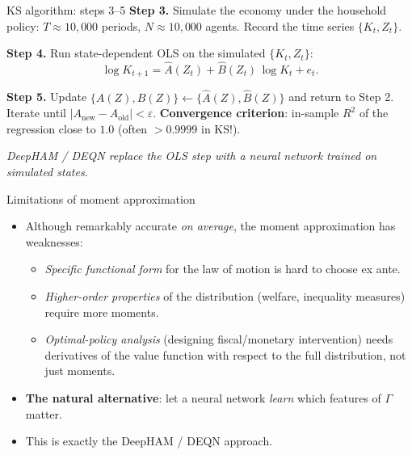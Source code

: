 \begin{frame}{KS algorithm: steps 3--5}
\textbf{Step 3.} Simulate the economy under the household policy: $T \approx 10{,}000$ periods, $N \approx 10{,}000$ agents. Record the time series $\{K_t, Z_t\}$.
\medskip

\textbf{Step 4.} Run state-dependent OLS on the simulated $\{K_t, Z_t\}$:
\[
\log K_{t+1} = \hat A(Z_t) + \hat B(Z_t)\,\log K_t + e_t.
\]
\medskip

\textbf{Step 5.} Update $\{A(Z), B(Z)\} \leftarrow \{\hat A(Z), \hat B(Z)\}$ and return to Step 2. Iterate until $|A_{\text{new}} - A_{\text{old}}| < \varepsilon$.
\medskip
\textbf{Convergence criterion}: in-sample $R^2$ of the regression close to $1.0$ (often $> 0.9999$ in KS!).
\medskip
\begin{center}
\scriptsize
{}
\end{center}
\vspace{-0.4em}
{\scriptsize\textit{DeepHAM / DEQN replace the OLS step with a neural network trained on simulated states.}}
\end{frame}

\begin{frame}{Limitations of moment approximation}
\begin{itemize}
\item Although remarkably accurate \emph{on average}, the moment approximation has weaknesses:
\medskip
\begin{itemize}
\item \emph{Specific functional form} for the law of motion is hard to choose ex ante.
\item \emph{Higher-order properties} of the distribution (welfare, inequality measures) require more moments.
\item \emph{Optimal-policy analysis} (designing fiscal/monetary intervention) needs derivatives of the value function with respect to the full distribution, not just moments.
\end{itemize}
\medskip
\item \textbf{The natural alternative}: let a neural network \emph{learn} which features of $\Gamma$ matter.
\medskip
\item This is exactly the DeepHAM / DEQN approach.
\end{itemize}
\end{frame}

